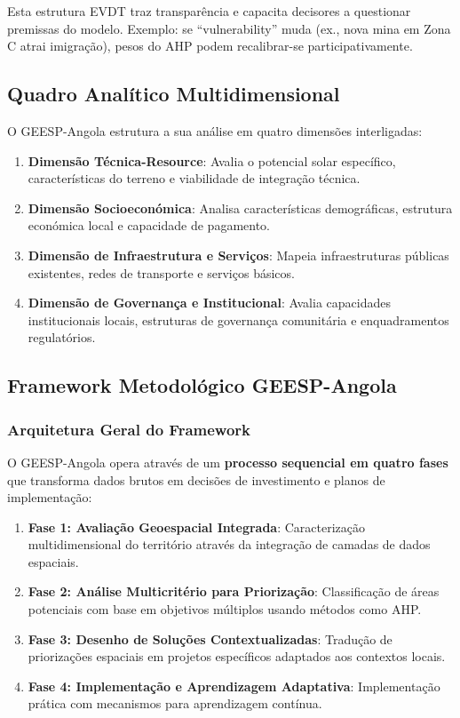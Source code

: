 \documentclass[12pt, a4paper]{article}
\begin{document}
Esta estrutura EVDT traz transparência e capacita decisores a questionar premissas do modelo. Exemplo: se ``vulnerability'' muda (ex., nova mina em Zona C atrai imigração), pesos do AHP podem recalibrar-se participativamente.

\subsection{Quadro Analítico Multidimensional}

O GEESP-Angola estrutura a sua análise em quatro dimensões interligadas:
\begin{enumerate}
\item \textbf{Dimensão Técnica-Resource}: Avalia o potencial solar específico, características do terreno e viabilidade de integração técnica.
\item \textbf{Dimensão Socioeconómica}: Analisa características demográficas, estrutura económica local e capacidade de pagamento.
\item \textbf{Dimensão de Infraestrutura e Serviços}: Mapeia infraestruturas públicas existentes, redes de transporte e serviços básicos.
\item \textbf{Dimensão de Governança e Institucional}: Avalia capacidades institucionais locais, estruturas de governança comunitária e enquadramentos regulatórios.
\end{enumerate}

\subsection{Framework Metodológico GEESP-Angola}

\subsubsection{Arquitetura Geral do Framework}

O GEESP-Angola opera através de um \textbf{processo sequencial em quatro fases} que transforma dados brutos em decisões de investimento e planos de implementação:

\begin{enumerate}
\item \textbf{Fase 1: Avaliação Geoespacial Integrada}: Caracterização multidimensional do território através da integração de camadas de dados espaciais.
\item \textbf{Fase 2: Análise Multicritério para Priorização}: Classificação de áreas potenciais com base em objetivos múltiplos usando métodos como AHP.
\item \textbf{Fase 3: Desenho de Soluções Contextualizadas}: Tradução de priorizações espaciais em projetos específicos adaptados aos contextos locais.
\item \textbf{Fase 4: Implementação e Aprendizagem Adaptativa}: Implementação prática com mecanismos para aprendizagem contínua.
\end{enumerate}
\end{document}
